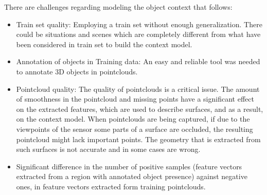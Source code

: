 
There are challenges regarding modeling the object context that follows:

\begin{itemize}
%    
 \item Train set quality: Employing a train set without enough generalization. There could be situations and scenes which are completely different from
	what have been considered in train set to build the context model.
	
	\item Annotation of objects in Training data: An easy and reliable tool was needed to annotate 3D objects in pointclouds.
	
 \item Pointcloud quality: The quality of pointclouds is a critical issue. The amount of smoothness in the pointcloud and missing points have a 
 significant effect on the extracted features, which are used to describe surfaces, and as a result, on the context model. 
 When pointclouds are being captured, if due to the viewpoints of the sensor some parts of a surface are occluded, 
 the resulting pointcloud might lack important points.
 The geometry that is extracted from such surfaces is not accurate and in some cases are wrong.
 
 \item Significant difference in the number of positive samples (feature vectors extracted from a region with annotated object presence) against negative ones, in feature vectors extracted form training pointclouds.
 
\end{itemize}

